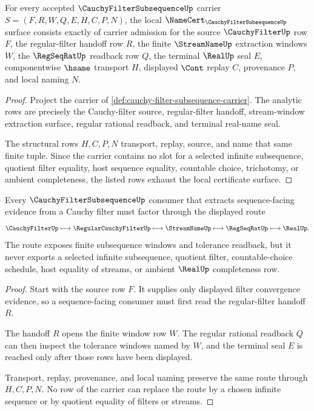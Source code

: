 \begin{theorem}
\label{thm:cauchy-filter-subsequence-namecert-obligations}
For every accepted $\CauchyFilterSubsequenceUp$ carrier $S=(F,R,W,Q,E,H,C,P,N)$, the local $\NameCert_{\CauchyFilterSubsequenceUp}$ surface consists exactly of carrier admission for the source $\CauchyFilterUp$ row $F$, the regular-filter handoff row $R$, the finite $\StreamNameUp$ extraction windows $W$, the $\RegSeqRatUp$ readback row $Q$, the terminal $\RealUp$ seal $E$, componentwise $\hsame$ transport $H$, displayed $\Cont$ replay $C$, provenance $P$, and local naming $N$.
\end{theorem}
\begin{proof}
Project the carrier of \autoref{def:cauchy-filter-subsequence-carrier}. The analytic rows are precisely the Cauchy-filter source, regular-filter handoff, stream-window extraction surface, regular rational readback, and terminal real-name seal.

The structural rows $H,C,P,N$ transport, replay, source, and name that same finite tuple. Since the carrier contains no slot for a selected infinite subsequence, quotient filter equality, host sequence equality, countable choice, trichotomy, or ambient completeness, the listed rows exhaust the local certificate surface.
\end{proof}

\begin{theorem}
\label{thm:cauchy-filter-subsequence-finite-window-route}
Every $\CauchyFilterSubsequenceUp$ consumer that extracts sequence-facing evidence from a Cauchy filter must factor through the displayed route
$$
\CauchyFilterUp \longmapsto \RegularCauchyFilterUp \longmapsto \StreamNameUp \longmapsto \RegSeqRatUp \longmapsto \RealUp .
$$
The route exposes finite subsequence windows and tolerance readback, but it never exports a selected infinite subsequence, quotient filter, countable-choice schedule, host equality of streams, or ambient $\RealUp$ completeness row.
\end{theorem}
\begin{proof}
Start with the source row $F$. It supplies only displayed filter convergence evidence, so a sequence-facing consumer must first read the regular-filter handoff $R$.

The handoff $R$ opens the finite window row $W$. The regular rational readback $Q$ can then inspect the tolerance windows named by $W$, and the terminal seal $E$ is reached only after those rows have been displayed.

Transport, replay, provenance, and local naming preserve the same route through $H,C,P,N$. No row of the carrier can replace the route by a chosen infinite sequence or by quotient equality of filters or streams.
\end{proof}

